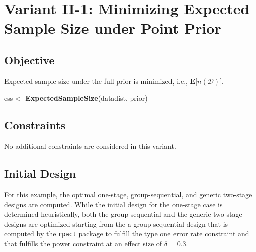 \documentclass[
]{book}
\newenvironment{Shaded}{\begin{snugshade}}{\end{snugshade}}
\newcommand{\KeywordTok}[1]{\textcolor[rgb]{0.13,0.29,0.53}{\textbf{#1}}}
\newcommand{\NormalTok}[1]{#1}
\newcommand{\StringTok}[1]{\textcolor[rgb]{0.31,0.60,0.02}{#1}}
\begin{document}
\hypertarget{variantII_1}{%
\section{Variant II-1: Minimizing Expected Sample Size under Point Prior}\label{variantII_1}}

\hypertarget{objective-3}{%
\subsection{Objective}\label{objective-3}}

Expected sample size under the full prior is minimized, i.e.,
\(\boldsymbol{E}\big[n(\mathcal{D})\big]\).

\begin{Shaded}
\begin{Highlighting}[]
\NormalTok{ess \textless{}{-}}\StringTok{ }\KeywordTok{ExpectedSampleSize}\NormalTok{(datadist, prior)}
\end{Highlighting}
\end{Shaded}

\hypertarget{constraints-3}{%
\subsection{Constraints}\label{constraints-3}}

No additional constraints are considered in this variant.

\hypertarget{initial-design-2}{%
\subsection{Initial Design}\label{initial-design-2}}

For this example, the optimal one-stage, group-sequential, and generic
two-stage designs are computed.
While the initial design for the one-stage case is determined heuristically,
both the group sequential and the generic two-stage designs are
optimized starting from the a group-sequential design that is computed by
the \texttt{rpact} package to fulfill the type one error rate constraint and
that fulfills the power constraint at an effect size of \(\delta = 0.3\).
\end{document}
